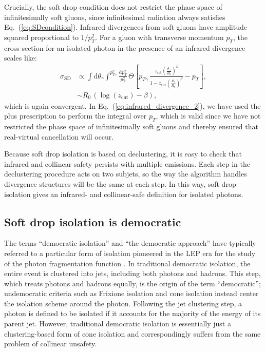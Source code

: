 \documentclass[a4paper,11pt]{article}
\DeclareRobustCommand{\Eq}[1]{Eq.~(\ref{#1})}
\begin{document}
Crucially, the soft drop condition does not restrict the phase space of infinitesimally soft gluons, since infinitesimal radiation always satisfies \Eq{eq:SDcondition}.
%
Infrared divergences from soft gluons have amplitude squared proportional to $1/p_T^2$.
%
For a gluon with transverse momentum $p_T$, the cross section for an isolated photon in the presence of an infrared divergence scales like:
%
\begin{subequations}
\begin{align}
    \sigma_{\text{SD}}
    & \propto \int \text{d} \theta_\gamma \int^{p_{T \gamma}^2} \frac{\text{d}p^2_T}{p_T^2} \, \Theta\left[p_{T\gamma}\, \frac{z_{\text{cut}} \left(\frac{\theta_\gamma}{R_0}\right)^{\beta}}{1 - z_{\text{cut}} \left(\frac{\theta_\gamma}{R_0}\right)^{\beta}} - p_T\right],
    \label{eq:infrared_divergence_1}%
    \\[10pt]
    & \sim R_0\,\left(\log\left(z_{\text{cut}}\right) - \beta\right),
\label{eq:infrared_divergence_2}%
\end{align}
\label{eq:infrared_divergence}%
\end{subequations}
%
which is again convergent.
%
In \Eq{eq:infrared_divergence_2}, we have used the plus prescription to perform the integral over $p_T$, which is valid since we have not restricted the phase space of infinitesimally soft gluons and thereby ensured that real-virtual cancellation will occur.

Because soft drop isolation is based on declustering, it is easy to check that infrared and collinear safety persists with multiple emissions.
%
Each step in the declustering procedure acts on two subjets, so the way the algorithm handles divergence structures will be the same at each step.
%
In this way, soft drop isolation gives an infrared- and collinear-safe definition for isolated photons.


\subsection{Soft drop isolation is democratic}
\label{sec:2.2}

The terms ``democratic isolation'' and ``the democratic approach'' have typically referred to a particular form of isolation pioneered in the LEP era for the study of the photon fragmentation function \cite{Buskulic:1995au, Glover:1993xc, GehrmannDeRidder:1997wx}.
%
In traditional democratic isolation, the entire event is clustered into jets, including both photons and hadrons. 
%
This step, which treats photons and hadrons equally, is the origin of the term ``democratic''; undemocratic criteria such as Frixione isolation and cone isolation instead center the isolation scheme around the photon.
%
Following the jet clustering step, a photon is defined to be isolated if it accounts for the majority of the energy of its parent jet.
%
However, traditional democratic isolation is essentially just a clustering-based form of cone isolation and correspondingly suffers from the same problem of collinear unsafety.
\end{document}
